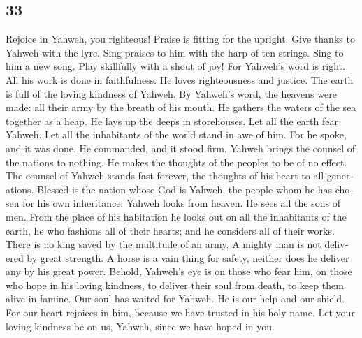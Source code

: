 \begin{paracol}{2}
\switchcolumn
\begin{otherlanguage}{english}

\hypertarget{section-65}{%
\section{33}\label{section-65}}

 Rejoice in Yahweh, you righteous! Praise is fitting for
the upright.  Give thanks to Yahweh with the lyre. Sing
praises to him with the harp of ten strings.  Sing to him
a new song. Play skillfully with a shout of joy!  For
Yahweh's word is right. All his work is done in faithfulness.
 He loves righteousness and justice. The earth is full of
the loving kindness of Yahweh.  By Yahweh's word, the
heavens were made: all their army by the breath of his mouth.
 He gathers the waters of the sea together as a heap. He
lays up the deeps in storehouses.  Let all the earth fear
Yahweh. Let all the inhabitants of the world stand in awe of him.
 For he spoke, and it was done. He commanded, and it stood
firm.  Yahweh brings the counsel of the nations to
nothing. He makes the thoughts of the peoples to be of no effect.
 The counsel of Yahweh stands fast forever, the thoughts
of his heart to all generations.  Blessed is the nation
whose God is Yahweh, the people whom he has chosen for his own
inheritance.  Yahweh looks from heaven. He sees all the
sons of men.  From the place of his habitation he looks
out on all the inhabitants of the earth,  he who fashions
all of their hearts; and he considers all of their works.
 There is no king saved by the multitude of an army. A
mighty man is not delivered by great strength.  A horse
is a vain thing for safety, neither does he deliver any by his great
power.  Behold, Yahweh's eye is on those who fear him, on
those who hope in his loving kindness,  to deliver their
soul from death, to keep them alive in famine.  Our soul
has waited for Yahweh. He is our help and our shield. 
For our heart rejoices in him, because we have trusted in his holy name.
 Let your loving kindness be on us, Yahweh, since we have
hoped in you.

\end{otherlanguage}


\end{paracol}
